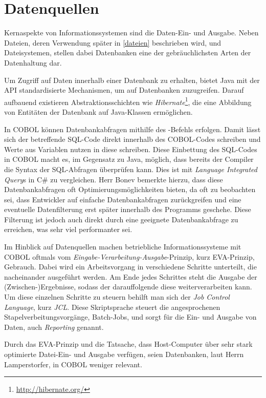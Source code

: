 \section{Datenquellen}

Kernaspekte von Informationssystemen sind die Daten-Ein- und Ausgabe. Neben Dateien, deren Verwendung später in \autoref{dateien} beschrieben wird, und Dateisystemen, stellen dabei Datenbanken eine der gebräuchlichsten Arten der Datenhaltung dar.

Um Zugriff auf Daten innerhalb einer Datenbank zu erhalten, bietet Java mit der  API standardisierte Mechanismen, um auf Datenbanken zuzugreifen. Darauf aufbauend existieren Abstraktionsschichten wie \textit{Hibernate}\footnote{\url{http://hibernate.org/} \visitedOn}, die eine Abbildung von Entitäten der Datenbank auf Java-Klassen ermöglichen.

In COBOL können Datenbankabfragen mithilfe des -Befehls erfolgen. Damit lässt sich der betreffende SQL-Code direkt innerhalb des COBOL-Codes schreiben und Werte aus Variablen nutzen \bzw in diese schreiben. Diese Einbettung des SQL-Codes in COBOL macht es, im Gegensatz zu Java, möglich, dass bereits der Compiler die Syntax der SQL-Abfragen überprüfen kann. Dies ist mit \textit{Language Integrated Query}s in C\# zu vergleichen. Herr Bonev bemerkte hierzu, dass diese Datenbankabfragen oft Optimierungsmöglichkeiten bieten, da oft zu beobachten sei, dass Entwickler auf einfache Datenbankabfragen zurückgreifen und eine eventuelle Datenfilterung erst später innerhalb des Programms geschehe. Diese Filterung ist jedoch auch direkt durch eine geeignete Datenbankabfrage zu erreichen, was sehr viel performanter sei. 

Im Hinblick auf Datenquellen machen betriebliche Informationssysteme mit COBOL oftmals vom \textit{Eingabe-Verarbeitung-Ausgabe}-Prinzip, kurz EVA-Prinzip, Gebrauch. Dabei wird ein Arbeitsvorgang in verschiedene Schritte unterteilt, die nacheinander ausgeführt werden. Am Ende jedes Schrittes steht die Ausgabe der (Zwischen-)Ergebnisse, sodass der darauffolgende diese weiterverarbeiten kann. Um diese einzelnen Schritte zu steuern behilft man sich der \textit{Job Control Language}, kurz \textit{JCL}. Diese Skriptsprache steuert die angesprochenen Stapelverbeitungsvorgänge, \engl Batch-Jobs, und sorgt für die Ein- und Ausgabe von Daten, auch \textit{Reporting} genannt. 

Durch das EVA-Prinzip und die Tatsache, dass Host-Computer über sehr stark optimierte Datei-Ein- und Ausgabe verfügen, seien Datenbanken, laut Herrn Lamperstorfer, in COBOL weniger relevant.